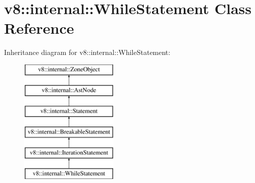 \hypertarget{classv8_1_1internal_1_1_while_statement}{}\section{v8\+:\+:internal\+:\+:While\+Statement Class Reference}
\label{classv8_1_1internal_1_1_while_statement}
Inheritance diagram for v8\+:\+:internal\+:\+:While\+Statement\+:\begin{figure}[H]
\begin{center}
\leavevmode
\includegraphics[height=6.000000cm]{classv8_1_1internal_1_1_while_statement}
\end{center}
\end{figure}
